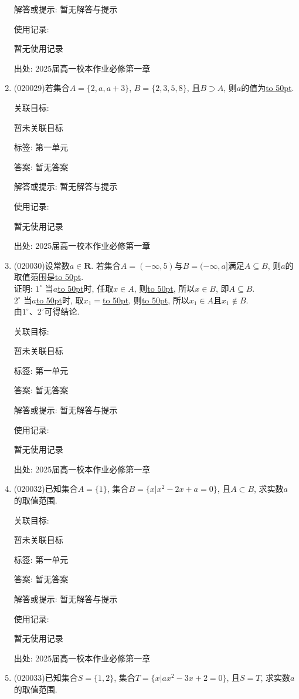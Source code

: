 \documentclass[10pt,a4paper]{article}
\newcommand{\blank}[1]{\underline{\hbox to #1pt{}}}
\begin{document}
\begin{enumerate}[1.]
解答或提示: 暂无解答与提示

使用记录:

暂无使用记录


出处: 2025届高一校本作业必修第一章
\item { (020029)}若集合$A=\{2,a,a+3\}$, $B=\{2,3,5,8\}$, 且$B\supset A$, 则$a$的值为\blank{50}.


关联目标:

暂未关联目标



标签: 第一单元

答案: 暂无答案

解答或提示: 暂无解答与提示

使用记录:

暂无使用记录


出处: 2025届高一校本作业必修第一章
\item { (020030)}设常数$a\in \mathbf{R}$. 若集合$A=(-\infty ,5)$与$B=(-\infty ,a]$满足$A\subseteq B$, 则$a$的取值范围是\blank{50}.\\
证明: $1^\circ$ 当$a$\blank{50}时, 任取$x\in A$, 则\blank{50}, 所以$x\in B$, 即$A\subseteq B$.\\ 
$2^\circ$ 当$a$\blank{50}时, 取$x_1=$\blank{50}, 则\blank{50}, 所以$x_1\in A$且$x_1\not \in B$.\\
由$1^\circ$、$2^\circ$可得结论.


关联目标:

暂未关联目标



标签: 第一单元

答案: 暂无答案

解答或提示: 暂无解答与提示

使用记录:

暂无使用记录


出处: 2025届高一校本作业必修第一章
\item { (020032)}已知集合$A=\{1\}$, 集合$B=\{x|x^2-2x+a=0\}$, 且$A\subset B$, 求实数$a$的取值范围.


关联目标:

暂未关联目标



标签: 第一单元

答案: 暂无答案

解答或提示: 暂无解答与提示

使用记录:

暂无使用记录


出处: 2025届高一校本作业必修第一章
\item { (020033)}已知集合$S=\{1, 2\}$, 集合$T=\{x|ax^2-3x+2=0\}$, 且$S=T$, 求实数$a$的取值范围.



\end{enumerate}
\end{document}
